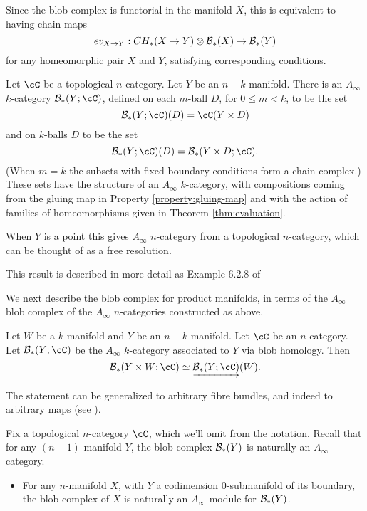 \documentclass{pnastwo}
\begin{document}
\begin{article}
Since the blob complex is functorial in the manifold $X$, this is equivalent to having chain maps
$$ev_{X \to Y} : CH_*(X \to Y) \otimes {\mathcal B}_*(X) \to {\mathcal B}_*(Y)$$
for any homeomorphic pair $X$ and $Y$, 
satisfying corresponding conditions.



\begin{thm}
\label{thm:blobs-ainfty}
Let $\cC$ be  a topological $n$-category.
Let $Y$ be an $n{-}k$-manifold. 
There is an $A_\infty$ $k$-category $\bc_*(Y;\cC)$, defined on each $m$-ball $D$, for $0 \leq m < k$, 
to be the set $$\bc_*(Y;\cC)(D) = \cC(Y \times D)$$ and on $k$-balls $D$ to be the set 
$$\bc_*(Y;\cC)(D) = \bc_*(Y \times D; \cC).$$ 
(When $m=k$ the subsets with fixed boundary conditions form a chain complex.) 
These sets have the structure of an $A_\infty$ $k$-category, with compositions coming from the gluing map in 
Property \ref{property:gluing-map} and with the action of families of homeomorphisms given in Theorem \ref{thm:evaluation}.
\end{thm}
\begin{rem}
When $Y$ is a point this gives $A_\infty$ $n$-category from a topological $n$-category, which can be thought of as a free resolution.
\end{rem}
This result is described in more detail as Example 6.2.8 of \cite{1009.5025}

We next describe the blob complex for product manifolds, in terms of the $A_\infty$ blob complex of the $A_\infty$ $n$-categories constructed as above.

\begin{thm}
\label{thm:product}
Let $W$ be a $k$-manifold and $Y$ be an $n-k$ manifold.
Let $\cC$ be an $n$-category.
Let $\bc_*(Y;\cC)$ be the $A_\infty$ $k$-category associated to $Y$ via blob homology.
Then
\[
	\bc_*(Y\times W; \cC) \simeq \cl{\bc_*(Y;\cC)}(W).
\]
\end{thm}
The statement can be generalized to arbitrary fibre bundles, and indeed to arbitrary maps
(see \cite[\S7.1]{1009.5025}).

Fix a topological $n$-category $\cC$, which we'll omit from the notation.
Recall that for any $(n-1)$-manifold $Y$, the blob complex ${\mathcal B}_*(Y)$ is naturally an $A_\infty$ category.

\begin{thm}
\label{thm:gluing}
\mbox{}%
\begin{itemize}
\item For any $n$-manifold $X$, with $Y$ a codimension $0$-submanifold of its boundary, the blob complex of $X$ is naturally an
$A_\infty$ module for ${\mathcal B}_*(Y)$.


\end{itemize}
\end{thm}
\end{article}
\end{document}
